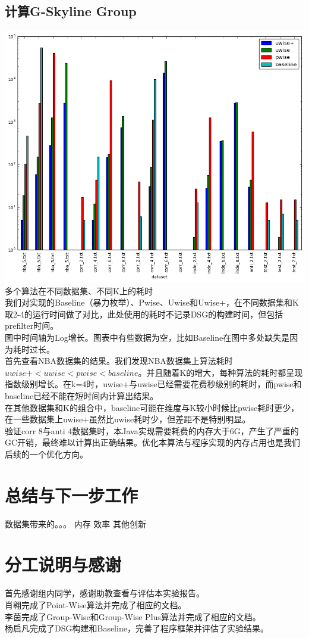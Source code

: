\documentclass{article}
\begin{document}
\begin{CJK}{UTF8}{gbsn}
\subsection{计算G-Skyline Group}

\includegraphics[scale=0.4]{pics/eval_4_algo_on_multi_dataset.png}
\\多个算法在不同数据集、不同K上的耗时\\
我们对实现的Baseline（暴力枚举）、Pwise、Uwise和Uwise+，在不同数据集和K取2-4的运行时间做了对比，此处使用的耗时不记录DSG的构建时间，但包括prefilter时间。\\
图中时间轴为Log增长。图表中有些数据为空，比如Baseline在图中多处缺失是因为耗时过长。\\
首先查看NBA数据集的结果。我们发现NBA数据集上算法耗时$uwise+ < uwise < pwise < baseline$。并且随着K的增大，每种算法的耗时都呈现指数级别增长。在k=4时，uwise+与uwise已经需要花费秒级别的耗时，而pwise和baseline已经不能在短时间内计算出结果。\\
在其他数据集和K的组合中，baseline可能在维度与K较小时候比pwise耗时更少，在一些数据集上uwise+虽然比uwise耗时少，但差距不是特别明显。\\
验证corr 8与anti 4数据集时，本Java实现需要耗费的内存大于6G，产生了严重的GC开销，最终难以计算出正确结果。优化本算法与程序实现的内存占用也是我们后续的一个优化方向。

\section{总结与下一步工作}
数据集带来的。。。
内存
效率
其他创新

\section{分工说明与感谢}
首先感谢组内同学，感谢助教查看与评估本实验报告。\\
肖翱完成了Point-Wise算法并完成了相应的文档。\\
李茵完成了Group-Wise和Group-Wise Plus算法并完成了相应的文档。\\
杨启凡完成了DSG构建和Baseline，完善了程序框架并评估了实验结果。\\
\end{CJK}
\end{document}

